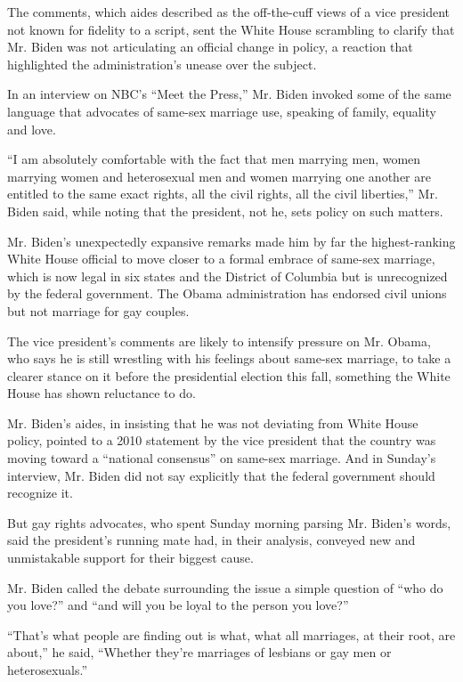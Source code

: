 The comments, which aides described as the off-the-cuff views of a vice
president not known for fidelity to a script, sent the White House
scrambling to clarify that Mr. Biden was not articulating an official
change in policy, a reaction that highlighted the administration's
unease over the subject.

In an interview on NBC's ``Meet the Press,'' Mr. Biden invoked some of
the same language that advocates of same-sex marriage use, speaking of
family, equality and love.

``I am absolutely comfortable with the fact that men marrying men, women
marrying women and heterosexual men and women marrying one another are
entitled to the same exact rights, all the civil rights, all the civil
liberties,'' Mr. Biden said, while noting that the president, not he,
sets policy on such matters.

Mr. Biden's unexpectedly expansive remarks made him by far the
highest-ranking White House official to move closer to a formal embrace
of same-sex marriage, which is now legal in six states and the District
of Columbia but is unrecognized by the federal government. The Obama
administration has endorsed civil unions but not marriage for gay
couples.

The vice president's comments are likely to intensify pressure on Mr.
Obama, who says he is still wrestling with his feelings about same-sex
marriage, to take a clearer stance on it before the presidential
election this fall, something the White House has shown reluctance to
do.

Mr. Biden's aides, in insisting that he was not deviating from White
House policy, pointed to a 2010 statement by the vice president that the
country was moving toward a ``national consensus'' on same-sex marriage.
And in Sunday's interview, Mr. Biden did not say explicitly that the
federal government should recognize it.

But gay rights advocates, who spent Sunday morning parsing Mr. Biden's
words, said the president's running mate had, in their analysis,
conveyed new and unmistakable support for their biggest cause.

Mr. Biden called the debate surrounding the issue a simple question of
``who do you love?'' and ``and will you be loyal to the person you
love?''

``That's what people are finding out is what, what all marriages, at
their root, are about,'' he said, ``Whether they're marriages of
lesbians or gay men or heterosexuals.''

